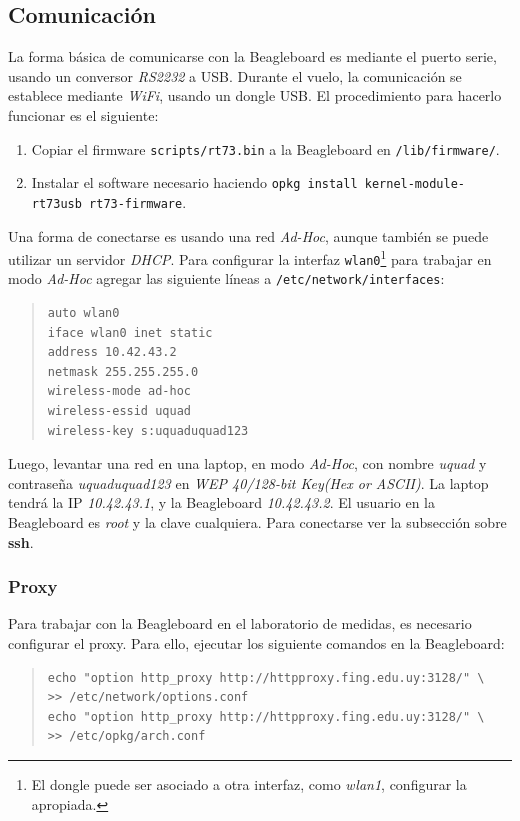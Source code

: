 \documentclass[main]{subfiles}
\begin{document}
\subsection{Comunicación}
\label{sec:codigo:comunicacion}

La forma básica de comunicarse con la Beagleboard es mediante el puerto serie, usando un conversor \textit{RS2232} a USB. Durante el vuelo, la comunicación se establece mediante \textit{WiFi}, usando un dongle USB. El procedimiento para hacerlo funcionar es el siguiente:

\begin{enumerate}
\item Copiar el firmware \verb+scripts/rt73.bin+ a la Beagleboard en \verb+/lib/firmware/+.
\item Instalar el software necesario haciendo \newline\verb+opkg install kernel-module-rt73usb rt73-firmware+.
\end{enumerate}

Una forma de conectarse es usando una red \textit{Ad-Hoc}, aunque también se puede utilizar un servidor \textit{DHCP}. Para configurar la interfaz \verb+wlan0+\footnote{El dongle puede ser asociado a otra interfaz, como \textit{wlan1}, configurar la apropiada.} para trabajar en modo \textit{Ad-Hoc} agregar las siguiente líneas a \verb+/etc/network/interfaces+:
\begin{quote}
\begin{verbatim}
auto wlan0
iface wlan0 inet static
address 10.42.43.2
netmask 255.255.255.0
wireless-mode ad-hoc
wireless-essid uquad
wireless-key s:uquaduquad123
\end{verbatim}
\end{quote}

Luego, levantar una red en una laptop, en modo \textit{Ad-Hoc}, con nombre \textit{uquad} y contraseña \textit{uquaduquad123} en \textit{WEP 40/128-bit Key(Hex or ASCII)}. La laptop tendrá la IP \textit{10.42.43.1}, y la Beagleboard \textit{10.42.43.2}. El usuario en la Beagleboard es \textit{root} y la clave cualquiera. Para conectarse ver la subsección sobre \textbf{ssh}.

\subsubsection{Proxy}
\label{sec:codigo:proxy}

Para trabajar con la Beagleboard en el laboratorio de medidas, es necesario configurar el proxy. Para ello, ejecutar los siguiente comandos en la Beagleboard:
\begin{quote}
\begin{verbatim}
echo "option http_proxy http://httpproxy.fing.edu.uy:3128/" \
>> /etc/network/options.conf
echo "option http_proxy http://httpproxy.fing.edu.uy:3128/" \
>> /etc/opkg/arch.conf
\end{verbatim}
\end{quote}
\end{document}
